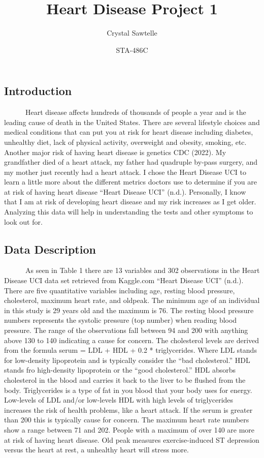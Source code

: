 \documentclass[
]{article}
\title{Heart Disease Project 1}
\author{Crystal Sawtelle}
\date{STA-486C}
\begin{document}
\maketitle

\hypertarget{introduction}{%
\subsection{Introduction}\label{introduction}}

~~~~~~Heart disease affects hundreds of thousands of people a year and
is the leading cause of death in the United States. There are several
lifestyle choices and medical conditions that can put you at risk for
heart disease including diabetes, unhealthy diet, lack of physical
activity, overweight and obesity, smoking, etc. Another major risk of
having heart disease is genetics CDC (2022). My grandfather died of a
heart attack, my father had quadruple by-pass surgery, and my mother
just recently had a heart attack. I chose the Heart Disease UCI to learn
a little more about the different metrics doctors use to determine if
you are at risk of having heart disease {``Heart {Disease} {UCI}''}
(n.d.). Personally, I know that I am at risk of developing heart disease
and my risk increases as I get older. Analyzing this data will help in
understanding the tests and other symptoms to look out for.

\hypertarget{data-description}{%
\subsection{Data Description}\label{data-description}}

~~~~~~As seen in Table 1 there are 13 variables and 302 observations in
the Heart Disease UCI data set retrieved from Kaggle.com {``Heart
{Disease} {UCI}''} (n.d.). There are five quantitative variables
including age, resting blood pressure, cholesterol, maximum heart rate,
and oldpeak. The minimum age of an individual in this study is 29 years
old and the maximum is 76. The resting blood pressure numbers represents
the systolic pressure (top number) when reading blood pressure. The
range of the observations fall between 94 and 200 with anything above
130 to 140 indicating a cause for concern. The cholesterol levels are
derived from the formula serum = LDL + HDL + 0.2 * triglycerides. Where
LDL stands for low-density lipoprotein and is typically consider the
``bad cholesterol.'' HDL stands fro high-density lipoprotein or the
``good cholesterol.'' HDL absorbs cholesterol in the blood and carries
it back to the liver to be flushed from the body. Triglycerides is a
type of fat in you blood that your body uses for energy. Low-levels of
LDL and/or low-levels HDL with high levels of triglycerides increases
the risk of health problems, like a heart attack. If the serum is
greater than 200 this is typically cause for concern. The maximum heart
rate numbers show a range between 71 and 202. People with a maximum of
over 140 are more at risk of having heart disease. Old peak measures
exercise-induced ST depression versus the heart at rest, a unhealthy
heart will stress more.
\end{document}
